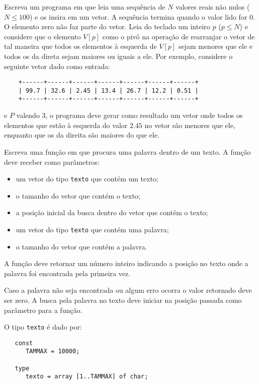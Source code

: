 \item Escreva um programa em  
que leia uma sequência de $N$ valores
reais não nulos ($N \leq 100$) e os insira em um vetor.
A sequência termina quando o valor lido for 0. O elemento zero não faz
parte do vetor. Leia do teclado um inteiro $p$ ($p \leq N$) e
considere que o elemento $V[p]$ como o pivô na operação
de rearranjar o vetor de tal maneira que todos os elementos à
esquerda de $V[p]$ sejam menores que ele e todos os da direta sejam
maiores ou iguais a ele. Por exemplo, considere o seguinte vetor dado
como entrada: 
\begin{center}
\begin{small}
\begin{verbatim}
    +------+------+------+------+------+------+------+
    | 99.7 | 32.6 | 2.45 | 13.4 | 26.7 | 12.2 | 0.51 | 
    +------+------+------+------+------+------+------+
\end{verbatim}
\end{small}
\end{center}
e $P$ valendo 3, o programa deve gerar como resultado um vetor onde
todos os elementos que estão à esquerda do valor $2.45$ no vetor sâo menores
que ele, enquanto que os da direita são maiores do que ele.

\item Escreva uma função em  que procura uma palavra dentro
de um texto. A função deve receber como parâmetros:
\begin{itemize}
\item um vetor do tipo \verb+texto+ que contém um texto;
\item o tamanho do vetor que contém o texto;
\item a posição inicial da busca dentro do vetor que contém o 
texto;
\item um vetor do tipo \verb+texto+ que contém uma palavra;
\item o tamanho do vetor que contém a palavra.
\end{itemize}
A função deve retornar um número inteiro indicando a posição
no texto onde a palavra foi encontrada pela primeira vez. 

Caso a palavra não seja encontrada ou algum erro ocorra o 
valor retornado deve ser zero. A busca pela palavra no texto 
deve iniciar na posição passada como parâmetro para a função.

O tipo \verb+texto+ é dado por:
\begin{center}
\begin{small}
\begin{verbatim}
   const
      TAMMAX = 10000;

   type
      texto = array [1..TAMMAX] of char;

\end{verbatim}
\end{small}
\end{center}

